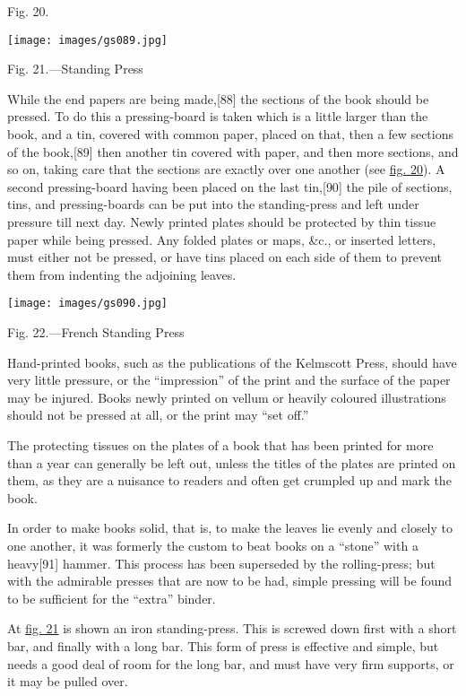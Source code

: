 \documentclass[
]{article}
\begin{document}
Fig. 20.

\protect\hypertarget{Fig_21}{}{}
\texttt{[image: images/gs089.jpg]}

Fig. 21.---Standing Press

While the end papers are being
made,{\protect\hypertarget{Page_88}{}{{[}88{]}}} the sections of the
book should be pressed. To do this a pressing-board is taken which is a
little larger than the book, and a tin, covered with common paper,
placed on that, then a few sections of the
book,{\protect\hypertarget{Page_89}{}{{[}89{]}}} then another tin
covered with paper, and then more sections, and so on, taking care that
the sections are exactly over one another (see
\protect\hyperlink{Fig_20}{fig. 20}). A second pressing-board having
been placed on the last tin,{\protect\hypertarget{Page_90}{}{{[}90{]}}}
the pile of sections, tins, and pressing-boards can be put into the
standing-press and left under pressure till next day. Newly printed
plates should be protected by thin tissue paper while being pressed. Any
folded plates or maps, \&c., or inserted letters, must either not be
pressed, or have tins placed on each side of them to prevent them from
indenting the adjoining leaves.

\protect\hypertarget{Fig_22}{}{}
\texttt{[image: images/gs090.jpg]}

Fig. 22.---French Standing Press

Hand-printed books, such as the publications of the Kelmscott Press,
should have very little pressure, or the ``impression'' of the print and
the surface of the paper may be injured. Books newly printed on vellum
or heavily coloured illustrations should not be pressed at all, or the
print may ``set off.''

The protecting tissues on the plates of a book that has been printed for
more than a year can generally be left out, unless the titles of the
plates are printed on them, as they are a nuisance to readers and often
get crumpled up and mark the book.

In order to make books solid, that is, to make the leaves lie evenly and
closely to one another, it was formerly the custom to beat books on a
``stone'' with a heavy{\protect\hypertarget{Page_91}{}{{[}91{]}}}
hammer. This process has been superseded by the rolling-press; but with
the admirable presses that are now to be had, simple pressing will be
found to be sufficient for the ``extra'' binder.

At \protect\hyperlink{Fig_21}{fig. 21} is shown an iron standing-press.
This is screwed down first with a short bar, and finally with a long
bar. This form of press is effective and simple, but needs a good deal
of room for the long bar, and must have very firm supports, or it may be
pulled over.
\end{document}
